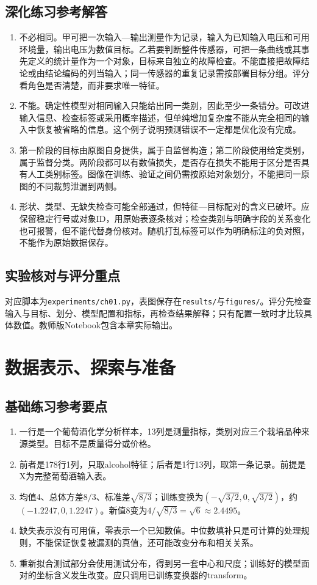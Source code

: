 \section*{深化练习参考解答}
\begin{enumerate}[label=D\arabic*.]
\item 不必相同。甲可把一次输入—输出测量作为记录，输入为已知输入电压和可用环境量，输出电压为数值目标。乙若要判断整件传感器，可把一条曲线或其事先定义的统计量作为一个对象，目标来自独立的故障检查。不能直接把故障结论或由结论编码的列当输入；同一传感器的重复记录需按部署目标分组。评分看角色是否清楚，而非要求唯一特征。
\item 不能。确定性模型对相同输入只能给出同一类别，因此至少一条错分。可改进输入信息、检查标签或采用概率描述，但单纯增加复杂度不能从完全相同的输入中恢复被省略的信息。这个例子说明预测错误不一定都是优化没有完成。
\item 第一阶段的目标由原图自身提供，属于自监督构造；第二阶段使用给定类别，属于监督分类。两阶段都可以有数值损失，是否存在损失不能用于区分是否具有人工类别标签。图像在训练、验证之间仍需按原始对象划分，不能把同一原图的不同裁剪泄漏到两侧。
\item 形状、类型、无缺失检查可能全部通过，但特征—目标配对的含义已破坏。应保留稳定行号或对象ID，用原始表逐条核对；检查类别与明确字段的关系变化也可报警，但不能代替身份核对。随机打乱标签可以作为明确标注的负对照，不能作为原始数据保存。
\end{enumerate}

\section*{实验核对与评分重点}
对应脚本为\texttt{experiments/ch01.py}，表图保存在\texttt{results/}与\texttt{figures/}。评分先检查输入与目标、划分、模型配置和指标，再检查结果解释；只有配置一致时才比较具体数值。教师版Notebook包含本章实际输出。

\chapter{数据表示、探索与准备}
\section*{基础练习参考要点}
\begin{enumerate}[label=\arabic*.]
\item 一行是一个葡萄酒化学分析样本，13列是测量指标，类别对应三个栽培品种来源类型。目标不是质量得分或价格。
\item 前者是178行1列，只取alcohol特征；后者是1行13列，取第一条记录。前提是X为完整葡萄酒输入表。
\item 均值4、总体方差$8/3$、标准差$\sqrt{8/3}$；训练变换为$(-\sqrt{3/2},0,\sqrt{3/2})$，约$(-1.2247,0,1.2247)$。新值8变为$4/\sqrt{8/3}=\sqrt6\approx2.4495$。
\item 缺失表示没有可用值，零表示一个已知数值。中位数填补只是可计算的处理规则，不能保证恢复被漏测的真值，还可能改变分布和相关关系。
\item 重新拟合测试部分会使用测试分布，得到另一套中心和尺度；训练好的模型面对的坐标含义发生改变。应只调用已训练变换器的transform。
\end{enumerate}
